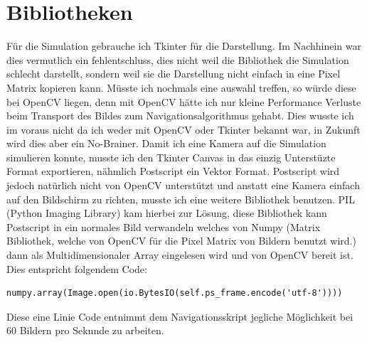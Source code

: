 \documentclass[12pt]{article}
\begin{document}
\section{Bibliotheken}
Für die Simulation gebrauche ich Tkinter für die Darstellung. Im Nachhinein war dies vermutlich ein fehlentschluss, dies nicht weil die Bibliothek die Simulation schlecht darstellt, sondern weil sie die Darstellung nicht einfach in eine Pixel Matrix kopieren kann.
Müsste ich nochmals eine auswahl treffen, so würde diese bei OpenCV liegen, denn mit OpenCV hätte ich nur kleine Performance Verluste beim Transport des Bildes zum Navigationsalgorithmus gehabt. Dies wusste ich im voraus nicht da ich weder mit OpenCV oder Tkinter bekannt war, in Zukunft wird dies aber ein No-Brainer.
Damit ich eine Kamera auf die Simulation simulieren konnte, musste ich den Tkinter Canvas in das einzig Unterstüzte Format exportieren, nähmlich Postscript ein Vektor Format. Postscript wird jedoch natürlich nicht von OpenCV unterstützt und anstatt eine Kamera einfach auf den Bildschirm zu richten, musste ich eine weitere Bibliothek benutzen. PIL (Python Imaging Library) kam hierbei zur Lösung, diese Bibliothek kann Postscript in ein normales Bild verwandeln welches von Numpy (Matrix Bibliothek, welche von OpenCV für die Pixel Matrix von Bildern benutzt wird.) dann als Multidimensionaler Array eingelesen wird und von OpenCV bereit ist.
Dies entspricht folgendem Code:
\begin{lstlisting}
numpy.array(Image.open(io.BytesIO(self.ps_frame.encode('utf-8'))))
\end{lstlisting}
Diese eine Linie Code entnimmt dem Navigationsskript jegliche Möglichkeit bei 60 Bildern pro Sekunde zu arbeiten.
\end{document}
